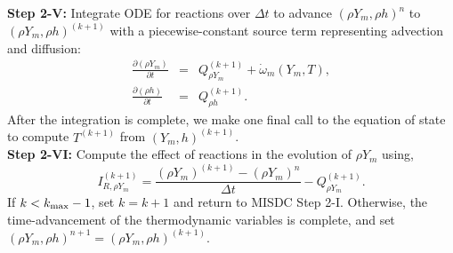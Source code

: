 {\bf Step 2-V:} Integrate ODE for reactions over $\Delta t$
to advance $(\rho Y_m,\rho h)^n$ to $(\rho Y_m,\rho h)^{(k+1)}$ with a piecewise-constant source term representing 
advection and diffusion:
\begin{eqnarray}
\frac{\partial(\rho Y_m)}{\partial t} &=& Q_{\rho Y_m}^{(k+1)} + \dot\omega_m(Y_m,T),\label{eq:MISDC VODE 3}\\
\frac{\partial(\rho h)}{\partial t} &=& Q_{\rho h}^{(k+1)}.\label{eq:MISDC VODE 4}
\end{eqnarray}
After the integration is complete, we make one final call to the equation of state
to compute $T^{(k+1)}$ from $(Y_m,h)^{(k+1)}$.\\

{\bf Step 2-VI:} Compute the effect of reactions in the evolution of $\rho Y_m$ using,
\begin{equation}
I_{R,\rho Y_m}^{(k+1)} = \frac{(\rho Y_m)^{(k+1)} - (\rho Y_m)^n}{\Delta t} - Q_{\rho Y_m}^{(k+1)}.
\end{equation}
If $k<k_{\rm max}-1$, set $k=k+1$ and return to MISDC Step 2-I.  Otherwise, the 
time-advancement of the thermodynamic variables is complete, and set 
$(\rho Y_m,\rho h)^{n+1} = (\rho Y_m,\rho h)^{(k+1)}$.
